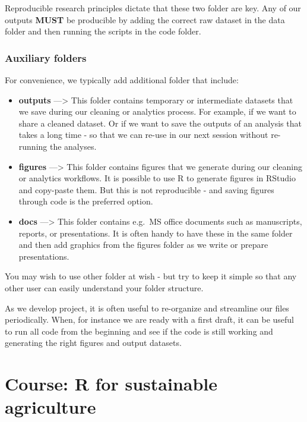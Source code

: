 \documentclass[
  letterpaper,
  DIV=11,
  numbers=noendperiod]{scrreprt}
\begin{document}
Reproducible research principles dictate that these two folder are key.
Any of our outputs \textbf{MUST} be producible by adding the correct raw
dataset in the data folder and then running the scripts in the code
folder.

\hypertarget{auxiliary-folders}{%
\section{Auxiliary folders}\label{auxiliary-folders}}

For convenience, we typically add additional folder that include:

\begin{itemize}
\item
  \textbf{outputs} ---\textgreater{} This folder contains temporary or
  intermediate datasets that we save during our cleaning or analytics
  process. For example, if we want to share a cleaned dataset. Or if we
  want to save the outputs of an analysis that takes a long time - so
  that we can re-use in our next session without re-running the
  analyses.
\item
  \textbf{figures} ---\textgreater{} This folder contains figures that
  we generate during our cleaning or analytics workflows. It is possible
  to use R to generate figures in RStudio and copy-paste them. But this
  is not reproducible - and saving figures through code is the preferred
  option.
\item
  \textbf{docs} ---\textgreater{} This folder contains e.g.~MS office
  documents such as manuscripts, reports, or presentations. It is often
  handy to have these in the same folder and then add graphics from the
  figures folder as we write or prepare presentations.
\end{itemize}

You may wish to use other folder at wish - but try to keep it simple so
that any other user can easily understand your folder structure.

As we develop project, it is often useful to re-organize and streamline
our files periodically. When, for instance we are ready with a first
draft, it can be useful to run all code from the beginning and see if
the code is still working and generating the right figures and output
datasets.

\part{Course: R for sustainable agriculture}
\end{document}
